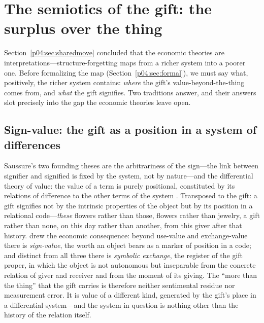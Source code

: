 \documentclass[11pt,a4paper]{article}
\begin{document}
\section{The semiotics of the gift: the surplus over the thing}
\label{p04:sec:semiotic}

Section~\ref{p04:sec:sharedmove} concluded that the economic theories are
interpretations---structure-forgetting maps from a richer system into a
poorer one. Before formalizing the map (Section~\ref{p04:sec:formal}), we must
say what, positively, the richer system contains: \emph{where} the gift's
value-beyond-the-thing comes from, and \emph{what} the gift signifies. Two
traditions answer, and their answers slot precisely into the gap the
economic theories leave open.

\subsection{Sign-value: the gift as a position in a system of differences}
\label{p04:sec:signvalue}
Saussure's two founding theses are the arbitrariness of the sign---the link
between signifier and signified is fixed by the system, not by nature---and
the differential theory of value: the value of a term is purely positional,
constituted by its relations of difference to the other terms of the system
\parencite{saussure1916}. Transposed to the gift: a gift signifies not by the
intrinsic properties of the object but by its position in a relational
code---\emph{these} flowers rather than those, flowers rather than jewelry, a
gift rather than none, on this day rather than another, from this giver
after that history. \textcite{baudrillard1981} drew the economic consequence:
beyond use-value and exchange-value there is \emph{sign-value}, the worth an
object bears as a marker of position in a code; and distinct from all three
there is \emph{symbolic exchange}, the register of the gift proper, in which
the object is not autonomous but inseparable from the concrete relation of
giver and receiver and from the moment of its giving. The ``more than the
thing'' that the gift carries is therefore neither sentimental residue nor
measurement error. It is value of a different kind, generated by the gift's
place in a differential system---and the system in question is nothing other
than the history of the relation itself.
\end{document}
